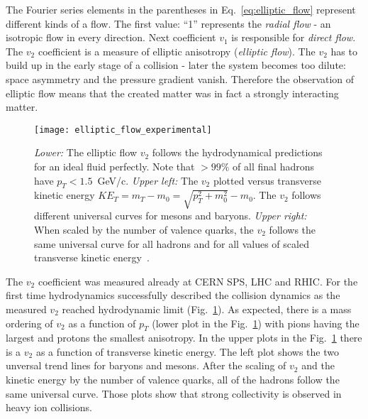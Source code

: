         The Fourier series elements in the parentheses in Eq.~\ref{eq:elliptic_flow} represent different kinds of a flow.
        The first value: ``1'' represents the \textit{radial flow} - an isotropic flow in every direction.
        Next coefficient $v_1$ is responsible for \textit{direct flow}.
        The $v_2$ coefficient is a measure of elliptic anisotropy (\textit{elliptic flow}).
        The $v_2$ has to build up in the early stage of a collision - later the system becomes too dilute: space asymmetry and the pressure gradient vanish.
        Therefore the observation of elliptic flow means that the created matter was in fact a strongly interacting matter.
        \begin{figure}[h]
          \centering
          \texttt{[image: elliptic\_flow\_experimental]}
          \caption{\textit{Lower:} The elliptic flow $v_2$ follows the hydrodynamical predictions for an ideal fluid perfectly. Note that $> 99\%$ of all final hadrons have $p_T < 1.5$~GeV/c. \textit{Upper left:} The $v_2$ plotted versus transverse kinetic energy $KE_T = m_T - m_0 = \sqrt{p_T^2 + m_0^2} - m_0$. The $v_2$ follows different universal curves for mesons and baryons. \textit{Upper right:} When scaled by the number of valence quarks, the $v_2$ follows the same universal curve for all hadrons and for all values of scaled transverse kinetic energy~\cite{heinz}.}
          \label{fig:elliptic_flow_experimental}
        \end{figure}

        The $v_2$ coefficient was measured already at CERN SPS, LHC and RHIC.
        For the first time hydrodynamics successfully described the collision dynamics as the measured $v_2$ reached hydrodynamic limit (Fig.~\ref{fig:elliptic_flow_experimental}).
        As expected, there is a mass ordering of $v_2$ as a function of $p_T$ (lower plot in the Fig.~\ref{fig:elliptic_flow_experimental}) with pions having the largest and protons the smallest anisotropy.
        In the upper plots in the Fig.~\ref{fig:elliptic_flow_experimental} there is a $v_2$ as a function of transverse kinetic energy.
        The left plot shows the two unversal trend lines for baryons and mesons.
        After the scaling of $v_2$ and the kinetic energy by the number of valence quarks, all of the hadrons follow the same universal curve.
        Those plots show that strong collectivity is observed in heavy ion collisions.
      \pagebreak
